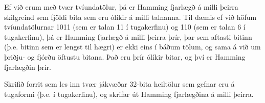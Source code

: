 \begin{problem}
	Ef við erum með tvær tvíundatölur, þá er Hamming fjarlægð á milli þeirra skilgreind sem fjöldi bita sem eru ólíkir á milli talnanna. Til dæmis ef við höfum tvíundatölurnar 1011 (sem er talan 11 í tugakerfinu) og 110 (sem er talan 6 í tugakerfinu), þá er Hamming fjarlægð á milli þeirra þrír, þar sem aftasti bitinn (þ.e. bitinn sem er lengst til hægri) er ekki eins í báðum tölum, og sama á við um þriðju- og fjórðu öftustu bitana. Það eru þrír ólíkir bitar, og því er Hamming fjarlægðin þrír.

	Skrifið forrit sem les inn tvær jákvæðar 32-bita heiltölur sem gefnar eru á tugaformi (þ.e. í tugakerfinu), og skrifar út Hamming fjarlægðina á milli þeirra.

\begin{example}
%
\end{example}
\begin{example}
%
\end{example}
\begin{example}
%
\end{example}
\begin{example}
%
\end{example}
\end{problem}